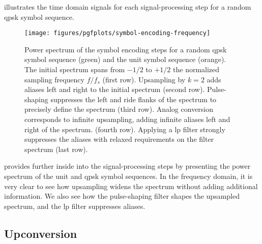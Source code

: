  illustrates the time domain signals for each signal-processing step for a random \gls{qpsk} symbol sequence.
\begin{figure}[htb]
	\centering
	\texttt{[image: figures/pgfplots/symbol-encoding-frequency]}
	\caption{Power spectrum of the symbol encoding steps for a random \gls{qpsk} symbol sequence (green) and the unit symbol sequence (orange). The initial spectrum spans from $-1/2$ to $+1/2$ the normalized sampling frequency $f/f_s$ (first row). Upsampling by $k=2$ adds aliases left and right to the initial spectrum (second row). Pulse-shaping suppresses the left and ride flanks of the spectrum to precisely define the spectrum (third row). Analog conversion corresponds to infinite upsampling, adding infinite aliases left and right of the spectrum. (fourth row). Applying a \gls{lp} filter strongly suppresses the aliases with relaxed requirements on the filter spectrum (last row).}\label{fig:baseband_construction_freq}
\end{figure}
 provides further inside into the signal-processing steps by presenting the power spectrum of the unit and \gls{qpsk} symbol sequences.
In the frequency domain, it is very clear to see how upsampling widens the spectrum without adding additional information.
We also see how the pulse-shaping filter shapes the upsampled spectrum, and the \gls{lp} filter suppresses aliases.

\FloatBarrier
\subsection{Upconversion}

